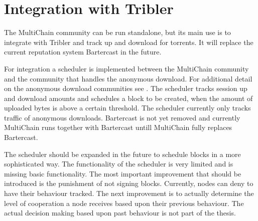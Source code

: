 \section{Integration with Tribler}
The MultiChain community can be run standalone,
but its main use is to integrate with Tribler and track up and download for torrents.
It will replace the current reputation system Bartercast in the future.

For integration a scheduler is implemented between the MultiChain community
and the community that handles the anonymous download.
For additional detail on the anonymous download communities see \cite{Plak-anonymous}\cite{ruigrok-anonymous}.
The scheduler tracks session up and download amounts and schedules a block to be created,
when the amount of uploaded bytes is above a certain threshold.
The scheduler currently only tracks traffic of anonymous downloads.
Bartercast is not yet removed and
currently MultiChain runs together with Bartercast untill MultiChain fully replaces Bartercast.

The scheduler should be expanded in the future to schedule blocks in a more sophisticated way.
The functionality of the scheduler is very limited and is missing basic functionality.
The most important improvement that should be introduced is the punishment of not signing blocks.
Currently, nodes can deny to have their behaviour tracked.
The next improvement is to actually determine the level of cooperation a node receives based upon their previous behaviour.
The actual decision making based upon past behaviour is not part of the thesis.